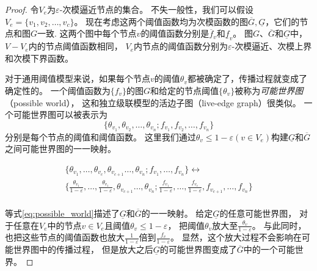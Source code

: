 \begin{proof}
令$V_e$为$\varepsilon$-次模逼近节点的集合。
不失一般性，我们可以假设$V_e = \{v_1,v_2,\dots,v_c\}$。
现在考虑这两个阈值函数均为次模函数的图$\overline{G}, \underline{G}$，它们的节点和图$G$一致.
这两个图中每个节点$v$的阈值函数分别是$\overline{f}_v$和$\underline{f}_v$。
图$G$、$\overline{G}$和$\underline{G}$中，$V-V_e$内的节点阈值函数相同，
$V_e$内节点的阈值函数分别为$\varepsilon$-次模逼近、次模上界和次模下界函数。

对于通用阈值模型来说，如果每个节点$v$的阈值$\theta_v$都被确定了，传播过程就变成了确定性的。
一个阈值函数为$\{f_v\}$的图$G$和给定的节点阈值$\{\theta_v\}$被称为{\it 可能世界图}（possible world），
这和独立级联模型的活边子图（live-edge graph）很类似。
一个可能世界图可以被表示为
$$\{\theta_{v_1},\theta_{v_2},\dots,\theta_{v_n};f_{v_1},f_{v_2},\dots,f_{v_n}\}$$
分别是每个节点的阈值和阈值函数。
这里我们通过$\theta_{v}\leq 1-\varepsilon (v\in V_e)$构建$\underline{G}$和$\overline{G}$之间可能世界图的一一映射。

\begin{equation}
\label{eq:possible_world}
\begin{array}{ll}
\{\theta_{v_1},\dots,\theta_{v_c},\theta_{v_{c+1}}\dots,\theta_{v_n};
f_{v_1}, \dots,f_{v_n}\} \leftrightarrow \\
\{\frac{\theta_{v_1}}{1-\varepsilon},\dots,\frac{\theta_{v_1}}{1-\varepsilon},\theta_{v_{c+1}}\dots,\theta_{v_n};
\frac{f_{v_1}}{1-\varepsilon},\dots,\frac{f_{v_c}}{1-\varepsilon},f_{v_{c+1}},\dots,f_{v_n}\} \\
\end{array}
\end{equation}

等式\ref{eq:possible_world}描述了$\underline{G}$和$\overline{G}$的一一映射。
给定$\underline{G}$的任意可能世界图，
对于任意在$V_e$中的节点$v\in V_e$且阈值$\theta_{v}\leq 1-\varepsilon$，
把阈值$\theta_{v}$放大至$\frac{\theta_{v}}{1-\varepsilon}$。
与此同时，也把这些节点的阈值函数也放大$\frac{1}{1-\varepsilon}$倍到$\frac{f_{v}}{1-\varepsilon}$。
显然，这个放大过程不会影响在可能世界图中的传播过程，
但是放大之后$\underline{G}$的可能世界图变成了$\overline{G}$中的一个可能世界。


\end{proof}
